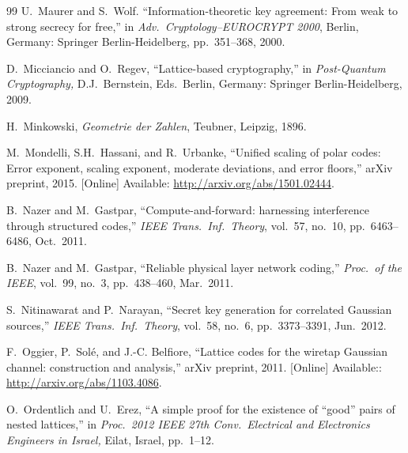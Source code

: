 \documentclass[main.tex]{subfiles}
\begin{document}
\begin{thebibliography}{99}
U.~Maurer and S.~Wolf. ``Information-theoretic key agreement: From weak to strong
secrecy for free,'' in \emph{Adv.\  Cryptology--EUROCRYPT 2000}, Berlin, Germany: Springer Berlin-Heidelberg,  pp.\ 351--368, 2000.

D.\ Micciancio and O.\ Regev, ``Lattice-based cryptography,'' in \emph{Post-Quantum Cryptography,} D.J.\ Bernstein, Eds.\ Berlin, Germany: Springer Berlin-Heidelberg, 2009.

H.\ Minkowski, \emph{Geometrie der Zahlen}, Teubner, Leipzig, 1896. 

M.~Mondelli, S.H.~Hassani, and R.~Urbanke, ``Unified scaling of polar codes: Error exponent, scaling exponent, moderate deviations, and error floors,''
arXiv preprint, 2015. [Online] Available: \url{http://arxiv.org/abs/1501.02444}.

B.~Nazer and M.~Gastpar, 
``Compute-and-forward: harnessing interference through structured codes,'' 
\emph{IEEE Trans.\ Inf.\ Theory}, vol.\ 57, no.\ 10, pp.\ 6463--6486, Oct.\ 2011.

B.~Nazer and M.~Gastpar, ``Reliable physical layer network coding,''
  \emph{Proc.\ of the IEEE}, vol.~99, no.~3, pp.~438--460, Mar.\ 2011.

S.~Nitinawarat and P.~Narayan, ``Secret key generation for correlated Gaussian sources,'' 
\emph{IEEE Trans.\ Inf.\ Theory}, vol.\ 58, no.\ 6, pp.\ 3373--3391, Jun.\ 2012.


F.~Oggier, P.~Sol\'{e}, and J.-C. Belfiore, ``Lattice codes for the wiretap Gaussian channel: construction and analysis,'' arXiv preprint, 2011. [Online] Available:: \url{http://arxiv.org/abs/1103.4086}.

O.\ Ordentlich and  U.\ Erez, ``A simple proof for the existence of ``good'' pairs of nested lattices,'' in \emph{Proc.\ 2012 IEEE 27th Conv.\ Electrical and Electronics Engineers in Israel,} Eilat, Israel, pp.\ 1--12.


\end{thebibliography}
\end{document}
